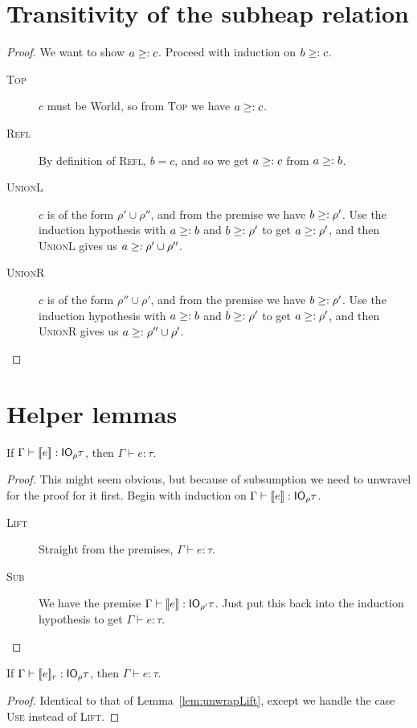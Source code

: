 \section{Transitivity of the subheap relation}\label{proof:subheaptransitive}
\begin{proof}
  We want to show $a \subtyp c$. Proceed with induction on $b \subtyp c$.
  \begin{description}
  \item[\rm\textsc{Top}]
    $c$ must be \textsf{World}, so from \textsc{Top} we have $a
    \subtyp c$.
  \item[\rm\textsc{Refl}] By definition of \textsc{Refl}, $b =
    c$, and so we get $a \subtyp c$ from $a \subtyp b$.
  \item[\rm\textsc{UnionL}] $c$ is of the form $\rho' \cup \rho''$, and
    from the premise we have $b \subtyp \rho'$. Use the induction
    hypothesis with $a \subtyp b$ and $b \subtyp \rho'$ to get $a \subtyp
    \rho'$, and then \textsc{UnionL} gives us $a \subtyp \rho' \cup \rho''$.
  \item[\rm\textsc{UnionR}]  $c$ is of the form $\rho'' \cup \rho'$, and
    from the premise we have $b \subtyp \rho'$. Use the induction
    hypothesis with $a \subtyp b$ and $b \subtyp \rho'$ to get $a \subtyp
    \rho'$, and then \textsc{UnionR} gives us $a \subtyp \rho'' \cup \rho'$.
  \end{description}
\end{proof}

\section{Helper lemmas}
\begin{lemma}\label{lem:unwrapLift}
  If $\Gamma \vdash \lift{e} : \IO_\rho \tau$, then $\Gamma \vdash e : \tau$.
\end{lemma}

\begin{proof}
  This might seem obvious, but because of subsumption we need to
  unwravel for the proof for it first. Begin with induction on $\Gamma \vdash
  \lift{e} : \IO_\rho \tau$.
  \begin{description}
  \item[\rm\textsc{Lift}] Straight from the premises, $\Gamma \vdash e : \tau$.
  \item[\rm\textsc{Sub}] We have the premise ${\Gamma \vdash \lift{e} : \IO_{\rho'}
    \tau}$. Just put this back into the induction hypothesis to get ${\Gamma \vdash e
    : \tau}$.
  \end{description}
\end{proof}

\begin{lemma}\label{lem:unwrapUse}
  If $\Gamma \vdash \use{r}{e} : \IO_\rho \tau$, then $\Gamma \vdash e : \tau$.
\end{lemma}
\begin{proof}
  Identical to that of Lemma~\ref{lem:unwrapLift}, except we handle
  the case \textsc{Use} instead of \textsc{Lift}.
\end{proof}